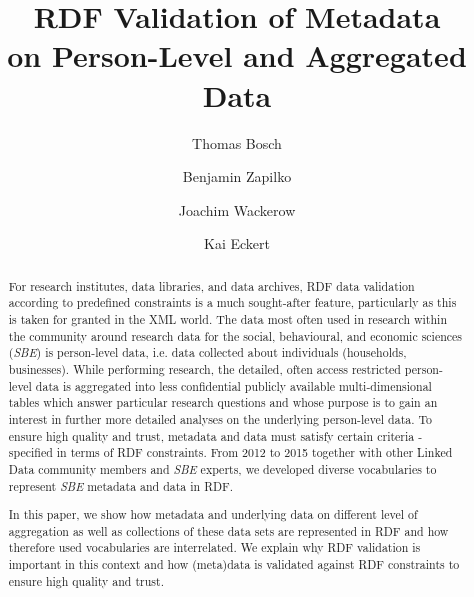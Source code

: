 \documentclass{llncs}
\begin{document}
\renewcommand{\arraystretch}{1.3}
%
%
\title{RDF Validation of Metadata \\ on Person-Level and Aggregated Data}
\subtitle{}

%
\author{Thomas Bosch \and Benjamin Zapilko \and Joachim Wackerow \and Kai Eckert}
%
\authorrunning{} %
%

\maketitle              %

\begin{abstract}
For research institutes, data libraries, and data archives,
RDF data validation according to predefined constraints is a much sought-after feature, 
particularly as this is taken for granted in the XML world.
The data most often used in research within the community around research data for the social, behavioural, and economic sciences (\emph{SBE}) is person-level data, i.e. data collected about individuals (households, businesses). 
While performing research, the detailed, often access restricted person-level
data is aggregated into less confidential publicly available multi-dimensional tables which answer particular research questions and whose purpose is to gain an interest in further more detailed analyses on the underlying person-level data.
To ensure high quality and trust, metadata and data must satisfy certain criteria - specified in terms of RDF constraints. 
From 2012 to 2015 together with other Linked Data community members and \emph{SBE} experts, we developed diverse vocabularies to represent \emph{SBE} metadata and data in RDF.

In this paper, we show how metadata and underlying data on different level of aggregation as well as collections of these data sets are represented in RDF and how therefore used vocabularies are interrelated.
We explain why RDF validation is important in this context and how (meta)data is validated against RDF constraints to ensure high quality and trust. 

\end{abstract}
\end{document}
